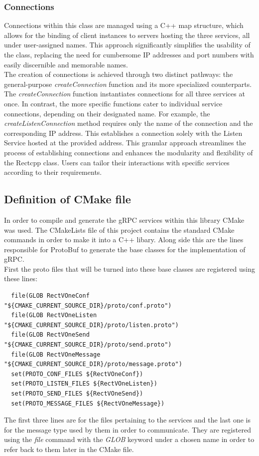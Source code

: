 \subsubsection{Connections}
Connections within this class are managed using a C++ map structure, which allows for the binding of client instances to servers hosting the three services, 
all under user-assigned names.  This approach significantly simplifies the usability of the class, replacing the need for cumbersome IP addresses and port 
numbers with easily discernible and memorable names. \\

The creation of connections is achieved through two distinct pathways: the general-purpose \textit{createConnection} function and its more specialized counterparts. 
The \textit{createConnection} function instantiates connections for all three services at once. In contrast, the more specific functions cater to individual service 
connections, depending on their designated name. For example, the \textit{createListenConnection} method requires only the name of the connection and the corresponding 
IP address. This establishes a connection solely with the Listen Service hosted at the provided address. This granular approach streamlines the process of 
establishing connections and enhances the modularity and flexibility of the Rectcpp class. Users can tailor their interactions with specific services according 
to their requirements.

\subsection{Definition of CMake file}
In order to compile and generate the gRPC services within this library CMake was used. The CMakeLists file of this project contains the standard CMake commands 
in order to make it into a C++ libary. Along side this are the lines responsible for ProtoBuf to generate the base classes for the implementation of gRPC. \\
First the proto files that will be turned into these base classes are registered using these lines: 
\begin{lstlisting}
  file(GLOB RectVOneConf "${CMAKE_CURRENT_SOURCE_DIR}/proto/conf.proto")
  file(GLOB RectVOneListen "${CMAKE_CURRENT_SOURCE_DIR}/proto/listen.proto")
  file(GLOB RectVOneSend "${CMAKE_CURRENT_SOURCE_DIR}/proto/send.proto")
  file(GLOB RectVOneMessage "${CMAKE_CURRENT_SOURCE_DIR}/proto/message.proto")
  set(PROTO_CONF_FILES ${RectVOneConf})
  set(PROTO_LISTEN_FILES ${RectVOneListen})
  set(PROTO_SEND_FILES ${RectVOneSend})
  set(PROTO_MESSAGE_FILES ${RectVOneMessage})
\end{lstlisting}
The first three lines are for the files pertaining to the services and the last one is for the message type used by them in order to communicate. They are registered
using the \textit{file} command with the \textit{GLOB} keyword under a chosen name in order to refer back to them later in the CMake file. \\

